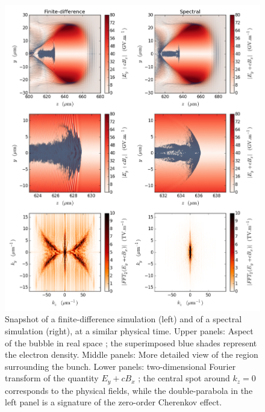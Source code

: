 \documentclass[1p,times,authoryear]{elsarticle}
\begin{document}
\begin{figure}[!h]
\centering
\includegraphics[width=\textwidth]{figures/Cherenkov.png}
\caption{\label{fig:Cherenkov}Snapshot of a finite-difference
  simulation (left) and of a spectral simulation (right), at a similar
  physical time. Upper panels: Aspect of the bubble in real space ; 
the superimposed blue shades represent the electron
  density. Middle panels: More detailed view of the region surrounding the
  bunch. Lower panels: two-dimensional Fourier transform of the
  quantity $E_y + cB_x$ ; the central spot around $k_z=0$ corresponds
  to the physical fields, while the double-parabola in the left panel
  is a signature of the zero-order Cherenkov effect.}
\end{figure}

\end{document}
